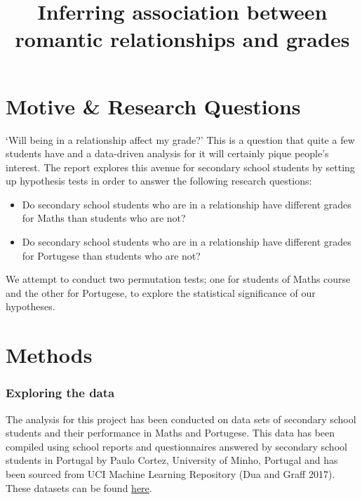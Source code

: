 \documentclass[]{article}
\title{Inferring association between romantic relationships and grades}
\author{}
\date{}
\providecommand{\tightlist}{%
  \setlength{\itemsep}{0pt}\setlength{\parskip}{0pt}}
\begin{document}
\maketitle

\hypertarget{motive-research-questions}{%
\section{Motive \& Research Questions}\label{motive-research-questions}}

`Will being in a relationship affect my grade?' This is a question that
quite a few students have and a data-driven analysis for it will
certainly pique people's interest. The report explores this avenue for
secondary school students by setting up hypothesis tests in order to
answer the following research questions:

\begin{itemize}
\tightlist
\item
  Do secondary school students who are in a relationship have different
  grades for Maths than students who are not?
\item
  Do secondary school students who are in a relationship have different
  grades for Portugese than students who are not?
\end{itemize}

We attempt to conduct two permutation tests; one for students of Maths
course and the other for Portugese, to explore the statistical
significance of our hypotheses.

\hypertarget{methods}{%
\section{Methods}\label{methods}}

\hypertarget{exploring-the-data}{%
\subsubsection{Exploring the data}\label{exploring-the-data}}

The analysis for this project has been conducted on data sets of
secondary school students and their performance in Maths and Portugese.
This data has been compiled using school reports and questionnaires
answered by secondary school students in Portugal by Paulo Cortez,
University of Minho, Portugal and has been sourced from UCI Machine
Learning Repository (Dua and Graff 2017). These datasets can be found
\href{https://archive.ics.uci.edu/ml/datasets/student+performance}{here}.
\end{document}
